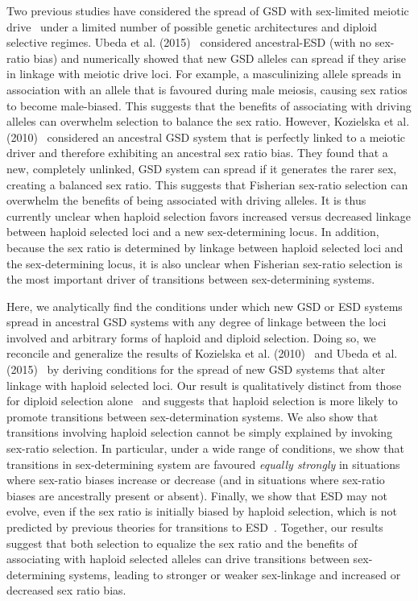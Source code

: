 \documentclass[10pt,letterpaper]{article}
\begin{document}
Two previous studies have considered the spread of GSD with sex-limited meiotic drive~\cite{Kozielska:2010vm,Ubeda:2015fx} under a limited number of possible genetic architectures and diploid selective regimes. 
Ubeda et al. (2015)~\cite{Ubeda:2015fx} considered ancestral-ESD (with no sex-ratio bias) and numerically showed that new GSD alleles can spread if they arise in linkage with meiotic drive loci. 
For example, a masculinizing allele spreads in association with an allele that is favoured during male meiosis, causing sex ratios to become male-biased.
This suggests that the benefits of associating with driving alleles can overwhelm selection to balance the sex ratio.
However, Kozielska et al. (2010)~\cite{Kozielska:2010vm} considered an ancestral GSD system that is perfectly linked to a meiotic driver and therefore exhibiting an ancestral sex ratio bias. 
They found that a new, completely unlinked, GSD system can spread if it generates the rarer sex, creating a balanced sex ratio. 
This suggests that Fisherian sex-ratio selection can overwhelm the benefits of being associated with driving alleles. 
It is thus currently unclear when haploid selection favors increased versus decreased linkage between haploid selected loci and a new sex-determining locus. 
In addition, because the sex ratio is determined by linkage between haploid selected loci and the sex-determining locus, it is also unclear when Fisherian sex-ratio selection is the most important driver of transitions between sex-determining systems. 

Here, we analytically find the conditions under which new GSD or ESD systems spread in ancestral GSD systems with any degree of linkage between the loci involved and arbitrary forms of haploid and diploid selection. 
Doing so, we reconcile and generalize the results of Kozielska et al. (2010)~\cite{Kozielska:2010vm} and Ubeda et al. (2015)~\cite{Ubeda:2015fx} by deriving conditions for the spread of new GSD systems that alter linkage with haploid selected loci.
Our result is qualitatively distinct from those for diploid selection alone~\cite{vanDoorn:2007eu,vanDoorn:2010hu} and suggests that haploid selection is more likely to promote transitions between sex-determination systems. 
We also show that transitions involving haploid selection cannot be simply explained by invoking sex-ratio selection. 
In particular, under a wide range of conditions, we show that transitions in sex-determining system are favoured \textit{equally strongly} in situations where sex-ratio biases increase or decrease (and in situations where sex-ratio biases are ancestrally present or absent). 
Finally, we show that ESD may not evolve, even if the sex ratio is initially biased by haploid selection, which is not predicted by previous theories for transitions to ESD~\cite{Charnov:1982wg,Bull:1983vi,West:2009we}. 
Together, our results suggest that both selection to equalize the sex ratio and the benefits of associating with haploid selected alleles can drive transitions between sex-determining systems, leading to stronger or weaker sex-linkage and increased or decreased sex ratio bias. 
\end{document}
